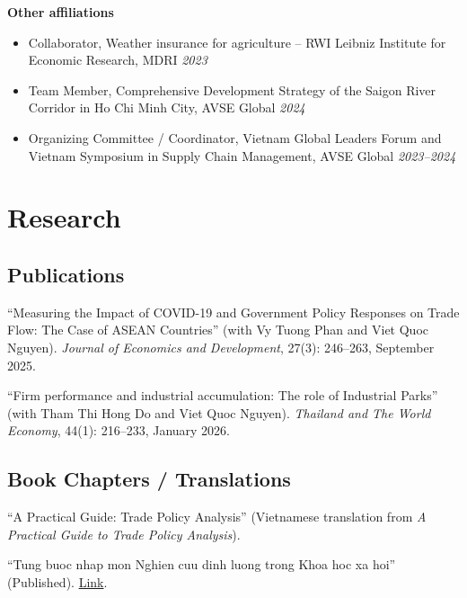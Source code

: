 \documentclass[10pt]{article}
\begin{document}
\textbf{Other affiliations}
\begin{itemize}
\item Collaborator, Weather insurance for agriculture -- RWI Leibniz Institute for Economic Research, MDRI \hfill \emph{2023}
\item Team Member, Comprehensive Development Strategy of the Saigon River Corridor in Ho Chi Minh City, AVSE Global \hfill \emph{2024}
\item Organizing Committee / Coordinator, Vietnam Global Leaders Forum and Vietnam Symposium in Supply Chain Management, AVSE Global \hfill \emph{2023--2024}
\end{itemize}

\section{Research}
\subsection{Publications}
\begin{enumerate}[label={[\arabic*]}]
\item ``Measuring the Impact of COVID-19 and Government Policy Responses on Trade Flow: The Case of ASEAN Countries'' (with Vy Tuong Phan and Viet Quoc Nguyen). \textit{Journal of Economics and Development}, 27(3): 246--263, September 2025.
\item ``Firm performance and industrial accumulation: The role of Industrial Parks'' (with Tham Thi Hong Do and Viet Quoc Nguyen). \textit{Thailand and The World Economy}, 44(1): 216--233, January 2026.
\end{enumerate}

\subsection{Book Chapters / Translations}
\begin{enumerate}[label={[\arabic*]}]
\item ``A Practical Guide: Trade Policy Analysis'' (Vietnamese translation from \textit{A Practical Guide to Trade Policy Analysis}).
\item ``Tung buoc nhap mon Nghien cuu dinh luong trong Khoa hoc xa hoi'' (Published). \href{https://iper.org.vn/tung-buoc-nhap-mon-nghien-cuu-dinh-luong-trong-khoa-hoc-xa-hoi/?fbclid=IwY2xjawHgVrpleHRuA2FlbQIxMAABHa6F89lOrPrL6ttiGWy61X8z5VlsBT-hDcrzjIUt9oHilFVG-pKhTq2CUQ_aem_buxMo8Ym0baFn8OR_dPpAw}{Link}.
\end{enumerate}
\end{document}
